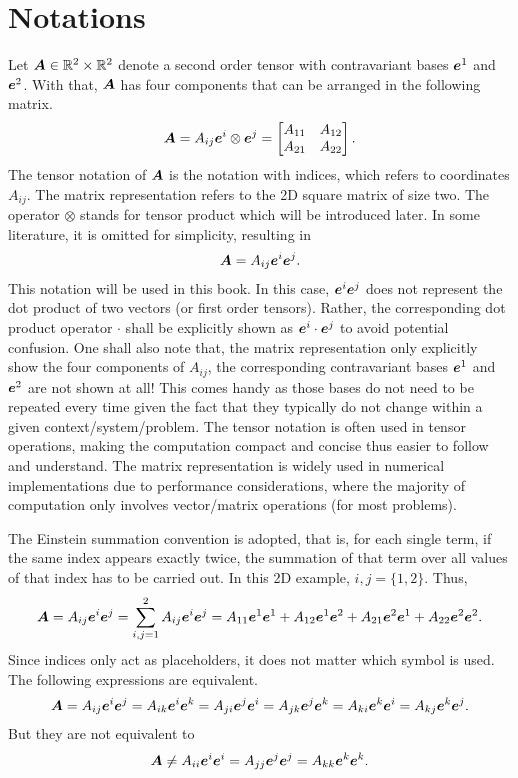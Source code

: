 \section{Notations}
Let $\bm{A}\in\mathbb{R}^2\times\mathbb{R}^2$ denote a second order tensor with contravariant bases $\bm{e}^1$ and $\bm{e}^2$. With that, $\bm{A}$ has four components that can be arranged in the following matrix.
\begin{gather}\label{eq:matrix_tensor}
\bm{A}=A_{ij}\bm{e}^i\otimes\bm{e}^j=\begin{bmatrix}
A_{11}&A_{12}\\
A_{21}&A_{22}
\end{bmatrix}.
\end{gather}
The tensor notation of $\bm{A}$ is the notation with indices, which refers to coordinates $A_{ij}$.
The matrix representation refers to the 2D square matrix of size two.
The operator $\otimes$ stands for tensor product which will be introduced later.
In some literature, it is omitted for simplicity, resulting in
\begin{gather}
\bm{A}=A_{ij}\bm{e}^i\bm{e}^j.
\end{gather}
This notation will be used in this book.
In this case, $\bm{e}^i\bm{e}^j$ does not represent the dot product of two vectors (or first order tensors).
Rather, the corresponding dot product operator $\cdot$ shall be explicitly shown as $\bm{e}^i\cdot\bm{e}^j$ to avoid potential confusion.
One shall also note that, the matrix representation only explicitly show the four components of $A_{ij}$, the corresponding contravariant bases $\bm{e}^1$ and $\bm{e}^2$ are not shown at all!
This comes handy as those bases do not need to be repeated every time given the fact that they typically do not change within a given context/system/problem.
The tensor notation is often used in tensor operations, making the computation compact and concise thus easier to follow and understand.
The matrix representation is widely used in numerical implementations due to performance considerations, where the majority of computation only involves vector/matrix operations (for most problems).

The Einstein summation convention is adopted, that is, for each single term, if the same index appears exactly twice, the summation of that term over all values of that index has to be carried out.
In this 2D example, $i,j=\{1,2\}$.
Thus,
\begin{gather}
\bm{A}=A_{ij}\bm{e}^i\bm{e}^j=\sum_{i,j=1}^{2}A_{ij}\bm{e}^i\bm{e}^j=A_{11}\bm{e}^1\bm{e}^1+A_{12}\bm{e}^1\bm{e}^2+A_{21}\bm{e}^2\bm{e}^1+A_{22}\bm{e}^2\bm{e}^2.
\end{gather}
Since indices only act as placeholders, it does not matter which symbol is used.
The following expressions are equivalent.
\begin{gather}
\bm{A}=A_{ij}\bm{e}^i\bm{e}^j=A_{ik}\bm{e}^i\bm{e}^k=A_{ji}\bm{e}^j\bm{e}^i=A_{jk}\bm{e}^j\bm{e}^k=A_{ki}\bm{e}^k\bm{e}^i=A_{kj}\bm{e}^k\bm{e}^j.
\end{gather}
But they are not equivalent to
\begin{gather}
\bm{A}\neq{}A_{ii}\bm{e}^i\bm{e}^i=A_{jj}\bm{e}^j\bm{e}^j=A_{kk}\bm{e}^k\bm{e}^k.
\end{gather}

